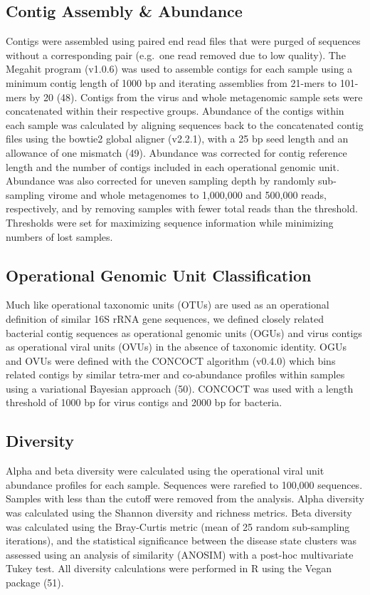 \documentclass[12pt,]{article}
\begin{document}
\subsection{Contig Assembly \&
Abundance}\label{contig-assembly-abundance}

Contigs were assembled using paired end read files that were purged of
sequences without a corresponding pair (e.g.~one read removed due to low
quality). The Megahit program (v1.0.6) was used to assemble contigs for
each sample using a minimum contig length of 1000 bp and iterating
assemblies from 21-mers to 101-mers by 20 (48). Contigs from the virus
and whole metagenomic sample sets were concatenated within their
respective groups. Abundance of the contigs within each sample was
calculated by aligning sequences back to the concatenated contig files
using the bowtie2 global aligner (v2.2.1), with a 25 bp seed length and
an allowance of one mismatch (49). Abundance was corrected for contig
reference length and the number of contigs included in each operational
genomic unit. Abundance was also corrected for uneven sampling depth by
randomly sub-sampling virome and whole metagenomes to 1,000,000 and
500,000 reads, respectively, and by removing samples with fewer total
reads than the threshold. Thresholds were set for maximizing sequence
information while minimizing numbers of lost samples.

\subsection{Operational Genomic Unit
Classification}\label{operational-genomic-unit-classification}

Much like operational taxonomic units (OTUs) are used as an operational
definition of similar 16S rRNA gene sequences, we defined closely
related bacterial contig sequences as operational genomic units (OGUs)
and virus contigs as operational viral units (OVUs) in the absence of
taxonomic identity. OGUs and OVUs were defined with the CONCOCT
algorithm (v0.4.0) which bins related contigs by similar tetra-mer and
co-abundance profiles within samples using a variational Bayesian
approach (50). CONCOCT was used with a length threshold of 1000 bp for
virus contigs and 2000 bp for bacteria.

\subsection{Diversity}\label{diversity}

Alpha and beta diversity were calculated using the operational viral
unit abundance profiles for each sample. Sequences were rarefied to
100,000 sequences. Samples with less than the cutoff were removed from
the analysis. Alpha diversity was calculated using the Shannon diversity
and richness metrics. Beta diversity was calculated using the
Bray-Curtis metric (mean of 25 random sub-sampling iterations), and the
statistical significance between the disease state clusters was assessed
using an analysis of similarity (ANOSIM) with a post-hoc multivariate
Tukey test. All diversity calculations were performed in R using the
Vegan package (51).
\end{document}
